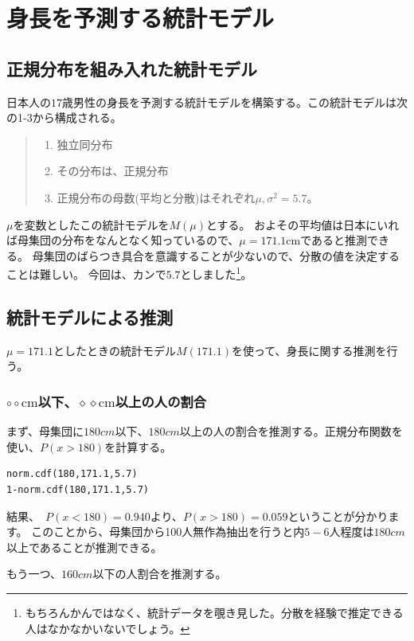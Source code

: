 \chapter{身長を予測する統計モデル}
\section{正規分布を組み入れた統計モデル}
日本人の$17$歳男性の身長を予測する統計モデルを構築する。この統計モデルは次の1-3から構成される。
\begin{quote}
    \begin{enumerate}[(1)]
    \item 独立同分布
    \item その分布は、正規分布
    \item 正規分布の母数(平均と分散)はそれぞれ$\mu,\sigma^2=5.7$。
    \end{enumerate}
\end{quote}

$\mu$を変数としたこの統計モデルを$M(\mu)$とする。
およその平均値は日本にいれば母集団の分布をなんとなく知っているので、$\mu=171.1\mathrm{cm}$であると推測できる。
母集団のばらつき具合を意識することが少ないので、分散の値を決定することは難しい。
今回は、カンで$5.7$としました\footnote{もちろんかんではなく、統計データを覗き見した。分散を経験で推定できる人はなかなかいないでしょう。}。

\section{統計モデルによる推測}
$\mu=171.1$としたときの統計モデル$M(171.1)$を使って、身長に関する推測を行う。

\subsection{ $\circ\circ \mathrm{cm}$以下、$\diamond\diamond \mathrm{cm}$以上の人の割合}
まず、母集団に$180cm$以下、$180cm$以上の人の割合を推測する。正規分布関数を使い、$P(x>180)$を計算する。

\begin{lstlisting}
norm.cdf(180,171.1,5.7)
1-norm.cdf(180,171.1,5.7)
\end{lstlisting}
結果、　$P(x<180)=0.940$より、$P(x>180)=0.059$ということが分かります。
このことから、母集団から100人無作為抽出を行うと内$5-6$人程度は$180cm$以上であることが推測できる。

もう一つ、$160cm$以下の人割合を推測する。

